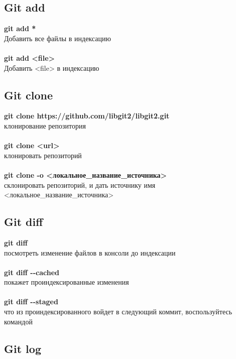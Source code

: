 \documentclass[a4paper, 12px]{article}
\begin{document}
\subsection{Git add}

\textbf{git add *}\\Добавить все файлы в индексацию\\\\
\textbf{git add <file>}\\Добавить <file> в индексацию

\subsection{Git clone}

\textbf{git clone https://github.com/libgit2/libgit2.git}
\\клонирование репозитория\\\\
\textbf{git clone <url>}\\клонировать репозиторий\\\\
\textbf{git clone -o <локальное\_название\_источника>}\\склонировать репозиторий, и дать источнику имя <локальное\_название\_источника>

\subsection{Git diff}

\textbf{git diff}\\посмотреть изменение файлов в консоли до индексации\\\\
\textbf{git diff -\--cached}\\покажет проиндексированные изменения\\\\
\textbf{git diff -\--staged}\\что из проиндексированного войдет в следующий коммит, воспользуйтесь командой

\subsection{Git log}
\end{document}
